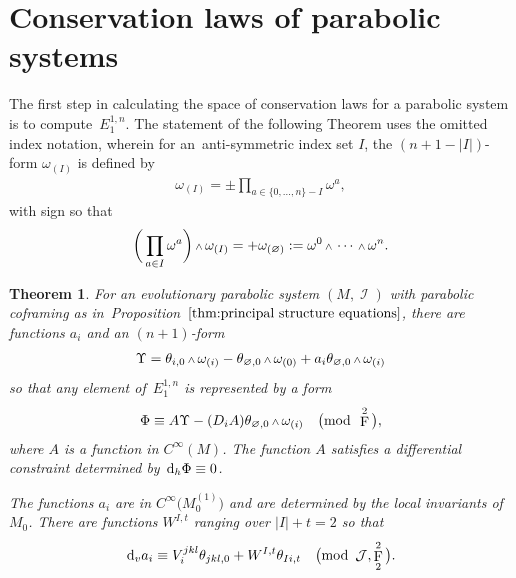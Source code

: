 \documentclass[pdftex]{sigma}
\DeclareMathOperator{\I}{\mathcal{I}}
\renewcommand{\d}{{\rm d}}
\newcommand{\cinfinity}[1]{C^\infty\big(#1\big)}
\renewcommand{\mod}[1]{\quad\big(\mathrm{mod\enspace} #1\big)}
\newcommand{\w}{{\mathchoice{\,{\scriptstyle\wedge}\,}{{\scriptstyle\wedge}}
 {{\scriptscriptstyle\wedge}}{{\scriptscriptstyle\wedge}}}}
\newcommand{\M}[1]{M_0^{(#1)}}
\newcommand{\thetas}[1]{\theta_{#1}}
\newcommand{\omegas}[1]{\omega_{(#1)}}
\DeclareMathOperator{\pwf}{F}
\renewcommand{\dh}{\ensuremath{\hspace{1pt} \d_h}}
\newcommand{\dv}{\ensuremath{\hspace{1pt} \d_v}}
\newcommand{\cartTheta}{\mathcal{J}}
\newcommand{\cMinfty}{C^\infty(M)}
\numberwithin{equation}{section}
\newtheorem{Theorem}{Theorem}[section]
\begin{document}
\section{Conservation laws of parabolic systems}\label{sec:conservation laws}
The first step in calculating the space of conservation laws for a parabolic system is to com\-pute~$E^{1,n}_1$. The statement of the following Theorem uses the omitted index notation, wherein for an~anti-symmetric index set $I$, the $(n+1-|I|)$-form $\omegas{I}$ is defined by
\begin{gather*}
\omegas{I} = \pm\prod_{a \in \{0,\dots, n\} - I} \omega^a ,
\end{gather*}
with sign so that
\begin{gather*}
\bigg( \prod_{a \in I} \omega^a \bigg) \w \omegas{I} = +\omegas{\varnothing} := \omega^0\w\cdots\w\omega^n .
\end{gather*}
\begin{Theorem}\label{thm:conservation laws linear part}
 For an evolutionary parabolic system $(M,\I)$ with parabolic coframing as in~Pro\-position~$\ref{thm:principal structure equations}$, there are functions $a_i$ and an $(n+1)$-form
 \begin{gather*}
 \Upsilon = \thetas{i,0}\w\omegas{i} - \thetas{\varnothing,0}\w\omegas{0} + a_i\thetas{\varnothing,0}\w\omegas{i}
 \end{gather*}
 so that any element of~$E^{1,n}_1$ is represented by a form
 \begin{gather*}
 \Phi \equiv A\Upsilon - (D_iA) \thetas{\varnothing,0}\w\omegas{i} \mod{\pwf^2},
 \end{gather*}
 where $A$ is a function in $\cMinfty$. The function $A$ satisfies a differential constraint determined by $\dh\Phi \equiv 0$.

 The functions $a_i$ are in $\cinfinity{\M{1}}$ and are determined by the local invariants of~$M_0$. There are functions $W^{I,t}$ ranging over $|I|+t = 2$ so that
 \begin{gather*}
 \dv a_i \equiv V_i^{jkl}\thetas{jkl,0} + W^{I,t}\thetas{Ii,t} \mod{\cartTheta, \pwf^2_2} .
 \end{gather*}
\end{Theorem}
\end{document}
